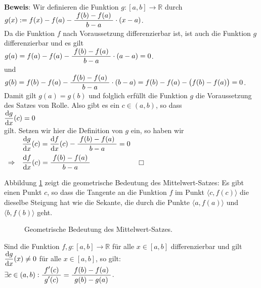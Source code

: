 \noindent
\textbf{Beweis}: Wir definieren die Funktion $g:[a,b] \rightarrow \mathbb{R}$ durch
\\[0.3cm]
\hspace*{1.3cm} $g(x) := f(x) - f(a) - \displaystyle\frac{\;\displaystyle f(b) - f(a)\;}{\;\displaystyle b-a\;}\cdot (x-a)$.
\\[0.3cm]
Da die Funktion $f$ nach Voraussetzung differenzierbar ist, ist auch die Funktion $g$ differenzierbar und es gilt 
\\[0.3cm]
\hspace*{1.3cm}
$g(a) = f(a) - f(a) - \displaystyle\frac{\;\displaystyle f(b) - f(a)\;}{\;\displaystyle b-a\;}\cdot (a-a) =0$.
\\[0.0cm]
und
\\[0.0cm]
\hspace*{1.3cm} $g(b) = f(b) - f(a) - \displaystyle\frac{\;\displaystyle f(b) - f(a)\;}{\;\displaystyle b-a\;}\cdot (b-a) = f(b) - f(a) - \bigl(f(b) - f(a)\bigr) = 0$.
\\[0.3cm]
Damit gilt $g(a) = g(b)$ und folglich erf\"ullt die Funktion $g$ die Voraussetzung des Satzes von Rolle.  Also gibt es ein
$c \in (a,b)$, so dass 
\\[0.3cm]
\hspace*{1.3cm}
$\displaystyle\frac{\textrm{d}g}{\textrm{d}x}(c) = 0$
\\[0.3cm]
gilt.  Setzen wir hier die Definition von $g$ ein, so haben wir 
\\[0.3cm]
\hspace*{1.3cm}
$
\begin{array}[b]{ll}
            & \displaystyle\frac{\textrm{d}g}{\textrm{d}x}(c) = \displaystyle\frac{\textrm{d}f}{\textrm{d}x}(c) - \displaystyle\frac{\;\displaystyle f(b) - f(a)\;}{\;\displaystyle b-a\;} = 0 \\[0.3cm]
\Rightarrow & \displaystyle\frac{\textrm{d}f}{\textrm{d}x}(c) = \displaystyle\frac{\;\displaystyle f(b) - f(a)\;}{\;\displaystyle b-a\;}
\end{array}
$
\hspace*{\fill} $\Box$
\vspace*{0.3cm}

Abbildung \ref{fig:mean-value-theorem} zeigt die geometrische Bedeutung des
Mittelwert-Satzes:  Es gibt einen Punkt $c$, so dass die Tangente an die Funktion $f$ im Punkt
$\langle c, f(c)\rangle$ die dieselbe Steigung hat wie die Sekante, die durch die Punkte
$\langle a,f(a) \rangle$ und $\langle b,f(b) \rangle$  geht. 
      \begin{figure}[!h]
        \centering
        \caption{Geometrische Bedeutung des Mittelwert-Satzes.}
        \label{fig:mean-value-theorem}
      \end{figure}


\begin{Satz}
  Sind die Funktion $f,g:[a,b] \rightarrow \mathbb{R}$ f\"ur alle $x\in[a,b]$
  differenzierbar und gilt $\displaystyle\frac{\textrm{d}g}{\textrm{d}x}(x) \not= 0$ f\"ur alle $x \in [a,b]$,
  so gilt: 
  \\[0.3cm]
  \hspace*{1.3cm}
  $\exists c \in (a,b): \displaystyle\frac{\;\displaystyle f'(c)\;}{\;\displaystyle g'(c)\;} = \displaystyle\frac{\;\displaystyle f(b) - f(a)\;}{\;\displaystyle g(b) - g(a)\;}$.
  \eox
\end{Satz}

